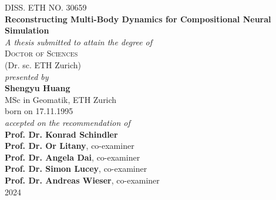 
\begin{center}
	\large{DISS. ETH NO. 30659}\\
\vspace{2 cm}
	\Large{\textbf{Reconstructing Multi-Body Dynamics for Compositional Neural Simulation}}\\
\vspace{1.5 cm}
	\large{\emph{A thesis submitted to attain the degree of}}\\
\vspace{0.5cm}
	\large{\textsc{Doctor of Sciences}}\\
\vspace{0.3cm}
	\large{(Dr. sc. ETH Zurich)}\\
\vspace{1.5cm}
	\large{\emph{presented by}}\\
\vspace{1.5cm}
	\large{\textbf{Shengyu Huang}}\\
\vspace{0.3cm}
	\large{MSc in Geomatik, ETH Zurich}\\
\vspace{1.5cm}
	\large{born on 17.11.1995}\\
\vspace{1.5cm}
	\large{\emph{accepted on the recommendation of}}\\
\vspace{0.5cm}
	\large{\textbf{Prof. Dr. Konrad Schindler} %
}\\
\vspace{0.1cm}
	\large{\textbf{Prof. Dr. Or Litany}, co-examiner %
}\\
\vspace{0.1cm}
	\large{\textbf{Prof. Dr. Angela Dai}, co-examiner %
}\\
\vspace{0.1cm}
	\large{\textbf{Prof. Dr. Simon Lucey}, co-examiner %
}\\
\vspace{0.1cm}
	\large{\textbf{Prof. Dr. Andreas Wieser}, co-examiner %
}\\

\vspace{1.5cm}
	\large{2024}
\end{center}


